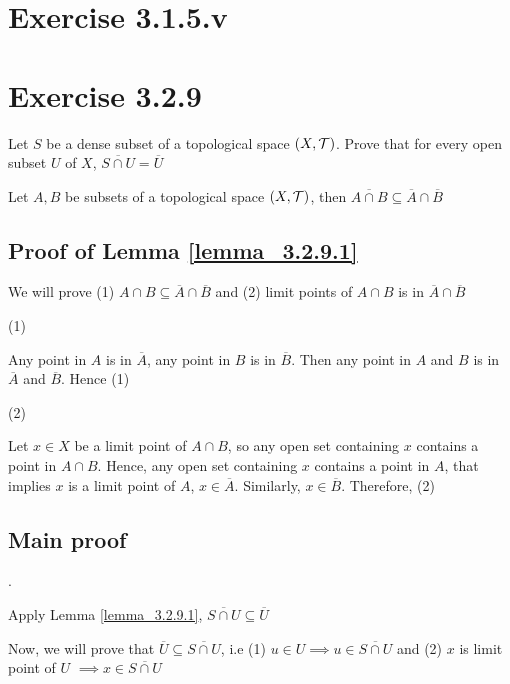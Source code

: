 \documentclass{article}
\begin{document}
\section*{Exercise 3.1.5.v}

\section*{Exercise 3.2.9}

Let $S$ be a dense subset of a topological space $(X, \mathcal{T})$. Prove that for every open subset $U$ of $X$, $\overline{S \cap U} = \overline{U}$



\begin{lemma}
    \label{lemma_3.2.9.1}
    Let $A, B$ be subsets of a topological space $(X, \mathcal{T})$, then $\overline{A \cap B} \subseteq \overline{A} \cap \overline{B}$
\end{lemma}

\subsection*{Proof of Lemma \ref{lemma_3.2.9.1}}

We will prove (1) $A \cap B \subseteq \overline{A} \cap \overline{B}$ and (2) limit points of $A \cap B$ is in $\overline{A} \cap \overline{B}$

(1)

Any point in $A$ is in $\overline{A}$, any point in $B$ is in $\overline{B}$. Then any point in $A$ and $B$ is in $\overline{A}$ and $\overline{B}$. Hence (1)

(2)

Let $x \in X$ be a limit point of $A \cap B$, so any open set containing $x$ contains a point in $A \cap B$. Hence, any open set containing $x$ contains a point in $A$, that implies $x$ is a limit point of $A$, $x \in \overline{A}$. Similarly, $x \in \overline{B}$. Therefore, (2)

\subsection*{Main proof} .

Apply Lemma \ref{lemma_3.2.9.1}, $\overline{S \cap U} \subseteq \overline{U}$

Now, we will prove that $\overline{U} \subseteq \overline{S \cap U}$, i.e (1) $u \in U \implies u \in \overline{S \cap U}$ and (2) $x$ is limit point of $U$ $\implies x \in \overline{S \cap U}$
\end{document}
